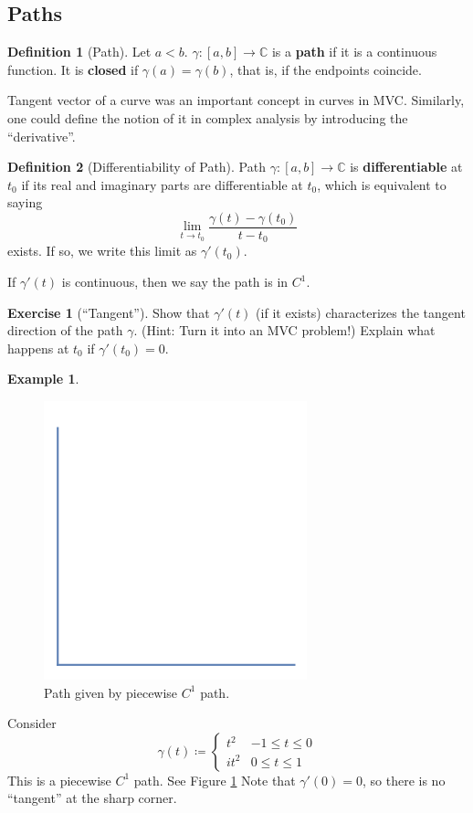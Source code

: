 \documentclass[a4paper, 12pt]{article}
\theoremstyle{definition}
\newtheorem{definition}{Definition}
\newtheorem{exercise}{Exercise}
\newtheorem{example}{Example}
\numberwithin{theorem}{section}
\numberwithin{definition}{section}
\numberwithin{exercise}{section}
\numberwithin{remark}{section}
\numberwithin{figure}{section}
\numberwithin{example}{section}
\newcommand{\C}{\mathbb{C}}
\begin{document}
\subsection{Paths}
\begin{definition}[Path]
    Let $a < b$.
    $\gamma:[a,b] \rightarrow \C$ is a \textbf{path} if it is a continuous function.
    It is \textbf{closed} if $\gamma(a) = \gamma(b)$, that is, if the endpoints coincide.
\end{definition}
Tangent vector of a curve was an important concept in curves in MVC.
Similarly, one could define the notion of it in complex analysis by
introducing the ``derivative''.
\begin{definition}[Differentiability of Path]
    Path $\gamma:\left[ a,b \right] \rightarrow \C$ is \textbf{differentiable} at $t_0$ if
    its real and imaginary parts are differentiable at $t_0$,
    which is equivalent to saying
    \begin{equation*}
        \lim_{t \rightarrow t_0} \frac{\gamma(t) - \gamma(t_0)}{t-t_0}
    \end{equation*}
    exists.
    If so, we write this limit as $\gamma'(t_0)$.

    If $\gamma'(t)$ is continuous, then we say the path is in $C^1$.
\end{definition}
\begin{exercise}[``Tangent'']
    Show that $\gamma'(t)$ (if it exists) characterizes the tangent direction of the path $\gamma$.
    (Hint: Turn it into an MVC problem!)
    Explain what happens at $t_0$ if $\gamma'(t_0) = 0$.
\end{exercise}
\begin{example}
    \begin{figure}[tbp]
        \centering
        \includegraphics{pathRightAngle}
        \caption{Path given by piecewise $C^1$ path.}
        \label{fig: Path Right Angle}
    \end{figure}
    Consider
    \begin{equation*}
        \gamma(t) \coloneqq
        \begin{cases}
            t^2 &-1 \leq t \leq 0 \\
            it^2& 0 \leq t \leq 1
        \end{cases}
    \end{equation*}
    This is a piecewise $C^1$ path. See Figure \ref{fig: Path Right Angle}
    Note that $\gamma'(0) = 0$, so there is no ``tangent'' at the sharp corner.
\end{example}
\end{document}
